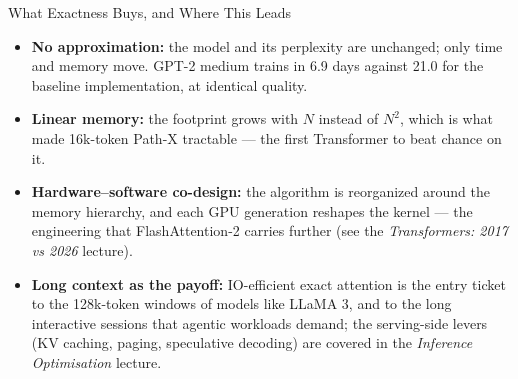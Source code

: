 \begin{frame}{What Exactness Buys, and Where This Leads}
    \begin{itemize}\itemsep0.4em
        \item \textbf{No approximation:} the model and its perplexity are unchanged; only time and memory move. GPT-2 medium trains in 6.9 days against 21.0 for the baseline implementation, at identical quality.
        \item \textbf{Linear memory:} the footprint grows with $N$ instead of $N^2$, which is what made 16k-token Path-X tractable --- the first Transformer to beat chance on it.
        \item \textbf{Hardware--software co-design:} the algorithm is reorganized around the memory hierarchy, and each GPU generation reshapes the kernel --- the engineering that FlashAttention-2 carries further (see the \emph{Transformers: 2017 vs 2026} lecture).
        \item \textbf{Long context as the payoff:} IO-efficient exact attention is the entry ticket to the 128k-token windows of models like LLaMA 3, and to the long interactive sessions that agentic workloads demand; the serving-side levers (KV caching, paging, speculative decoding) are covered in the \emph{Inference Optimisation} lecture.
    \end{itemize}
\end{frame}
